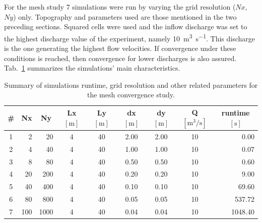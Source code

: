 For the mesh study \num{7} simulations were run by varying the grid resolution ($Nx$, $Ny$) only.
Topography and parameters used are those mentioned in the two preceding sections.
Squared cells were used and the inflow discharge was set to the highest discharge value of the experiment, namely \SI{10}{\cubic\meter\per\second}.
This discharge is the one generating the highest flow velocities.
If convergence under these conditions is reached, then convergence for lower discharges is also assured.
Tab.~\ref{tab:mesh_study} summarizes the simulations' main characteristics.

\begin{table}[h]
  \centering
  \caption{Summary of simulations runtime, grid resolution and other related parameters for the mesh convergence study.}
  \label{tab:mesh_study}
  \begin{tabular}{crrcccccr}
    \toprule
    \# & \multicolumn{1}{c}{Nx} & \multicolumn{1}{c}{Ny} & \multicolumn{1}{c}{Lx $[\si{\m}]$} & \multicolumn{1}{c}{Ly $[\si{\m}]$} & \multicolumn{1}{c}{dx $[\si{\m}]$} & \multicolumn{1}{c}{dy $[\si{\m}]$} & \multicolumn{1}{c}{Q $[\si{\cubic\m\per\s}]$} & \multicolumn{1}{c}{runtime $[\si{\s}]$} \\
    \midrule
    1  & 2             & 20            & 4               & 40          & 2.00        & 2.00        & 10                      & 0.00 \\
    2  & 4             & 40            & 4               & 40          & 1.00        & 1.00        & 10                      & 0.07 \\
    3  & 8             & 80            & 4               & 40          & 0.50        & 0.50        & 10                      & 0.60 \\
    4  & 20            & 200           & 4               & 40          & 0.20        & 0.20        & 10                      & 9.00 \\
    5  & 40            & 400           & 4               & 40          & 0.10        & 0.10        & 10                      & 69.60 \\
    6  & 80            & 800           & 4               & 40          & 0.05        & 0.05        & 10                      & 537.72 \\
    7  & 100           & 1000          & 4               & 40          & 0.04        & 0.04        & 10                      & 1048.40 \\
    \bottomrule
  \end{tabular}
\end{table}

